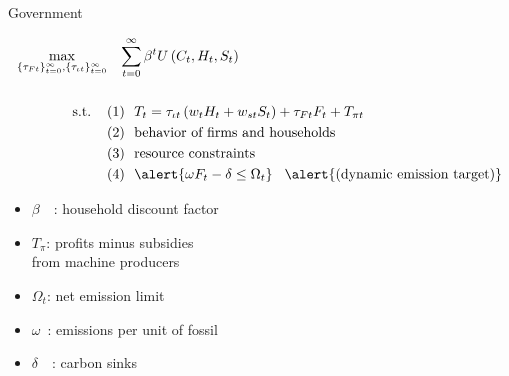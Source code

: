 \documentclass[11pt,aspectratio=169]{beamer}
\begin{document}
\addtocounter{framenumber}{-1}

\begin{frame}{ Government}
	\hypertarget{gov}{}
	\vspace{-4mm}
	\centering
	\begin{minipage}[t!]{1\textwidth}
		\begin{align*}
			\max_{\{\tau_{Ft}\}_{t=0}^{\infty}, \{\tau_{\iota t}\}_{t=0}^{\infty}}&\hspace{3mm} \sum_{t=0}^{\infty}\beta^t U\left(C_t,H_t, S_t\right)\\ \ \\
			\text{s.t.} \hspace{4mm}
			&{ (1)\ \ T_t=\tau_{\iota t}\left(w_{t}H_{t}+w_{st}S_{t}\right)+{{\tau_{Ft}}}F_{t}}+T_{\pi t}\\
			& {(2)\ \  \text{behavior of firms and households}}\\
			& {(3)\ \ \text{resource constraints} }\\
			&{(4)\ \  \alert{\omega F_t-\delta \leq\Omega_t }} \hspace{3mm} \alert{\text{(dynamic emission target)}}
		\end{align*}
	\end{minipage}
	
	\small
	\vspace{0mm}
	\hspace{-10mm}
	\begin{minipage}[t!]{0.5\textwidth}
		\vspace{7mm}
		\begin{itemize}
			\item[] $\beta$\ \ : household discount factor\vspace{-2mm}
			\item[] $T_\pi$: profits minus subsidies \\ \hspace{5.5mm} from machine producers \vspace{0mm}
		\end{itemize}
	\end{minipage}
	\begin{minipage}[t!]{0.45\textwidth}
		\vspace{8mm}
		\begin{itemize}
			\item[] $\Omega_{t}$: net emission limit
			\vspace{-2mm}	
			\item[] $\omega$\ : emissions per unit of fossil \vspace{-0.8mm}
			\item[] $\delta$\ \ : carbon sinks \tiny{\citep{VanVuuren2018AlternativeTechnologies}}
		\end{itemize}
	\end{minipage}
	
\end{frame}
\end{document}
